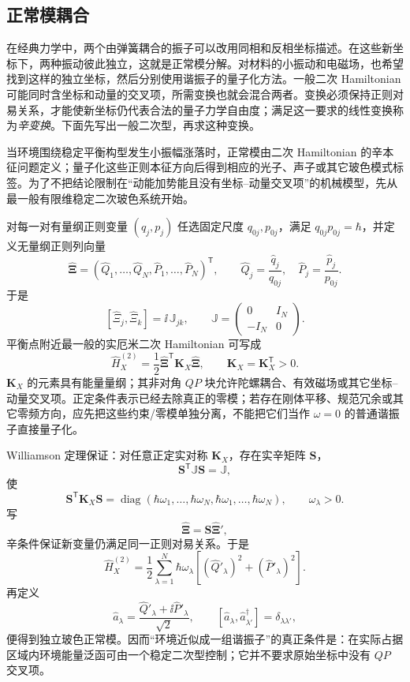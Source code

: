 

\subsection{正常模耦合}

在经典力学中，两个由弹簧耦合的振子可以改用同相和反相坐标描述。在这些新坐标下，两种振动彼此独立，这就是正常模分解。对材料的小振动和电磁场，也希望找到这样的独立坐标，然后分别使用谐振子的量子化方法。一般二次 Hamiltonian 可能同时含坐标和动量的交叉项，所需变换也就会混合两者。变换必须保持正则对易关系，才能使新坐标仍代表合法的量子力学自由度；满足这一要求的线性变换称为\emph{辛变换}。下面先写出一般二次型，再求这种变换。

当环境围绕稳定平衡构型发生小振幅涨落时，正常模由二次 Hamiltonian 的辛本征问题定义；量子化这些正则本征方向后得到相应的光子、声子或其它玻色模式标签。为了不把结论限制在“动能加势能且没有坐标--动量交叉项”的机械模型，先从最一般有限维稳定二次玻色系统开始。

对每一对有量纲正则变量 $(q_j,p_j)$ 任选固定尺度 $q_{0j},p_{0j}$，满足 $q_{0j}p_{0j}=\hbar$，并定义无量纲正则列向量
\[
\hat{\boldsymbol\Xi}
=
(\hat Q_1,\ldots,\hat Q_N,\hat P_1,\ldots,\hat P_N)^{\mathsf T},
\qquad
\hat Q_j=\frac{\hat q_j}{q_{0j}},
\quad
\hat P_j=\frac{\hat p_j}{p_{0j}}.
\]
于是
\[
[\hat\Xi_j,\hat\Xi_k]
=\ii\,\mathbb J_{jk},
\qquad
\mathbb J=
\begin{pmatrix}
0&I_N\\
-I_N&0
\end{pmatrix}.
\]
平衡点附近最一般的实厄米二次 Hamiltonian 可写成
\begin{equation}
\boxed{
\hat H_X^{(2)}
=
\frac12
\hat{\boldsymbol\Xi}^{\mathsf T}
\mathbf K_X
\hat{\boldsymbol\Xi},
\qquad
\mathbf K_X=\mathbf K_X^{\mathsf T}>0 .}
\label{eq:general_environment_quadratic_hamiltonian}
\end{equation}
$\mathbf K_X$ 的元素具有能量量纲；其非对角 $QP$ 块允许陀螺耦合、有效磁场或其它坐标--动量交叉项。正定条件表示已经去除真正的零模；若存在刚体平移、规范冗余或其它零频方向，应先把这些约束/零模单独分离，不能把它们当作 $\omega=0$ 的普通谐振子直接量子化。

Williamson 定理保证：对任意正定实对称 $\mathbf K_X$，存在实辛矩阵 $\mathbf S$，
\[
\mathbf S^{\mathsf T}\mathbb J\mathbf S=\mathbb J,
\]
使
\[
\mathbf S^{\mathsf T}\mathbf K_X\mathbf S
=
\operatorname{diag}
(\hbar\omega_1,\ldots,\hbar\omega_N,
 \hbar\omega_1,\ldots,\hbar\omega_N),
\qquad
\omega_\lambda>0.
\]
写
\[
\hat{\boldsymbol\Xi}
=\mathbf S\hat{\boldsymbol\Xi}',
\]
辛条件保证新变量仍满足同一正则对易关系。于是
\[
\hat H_X^{(2)}
=
\frac12\sum_{\lambda=1}^{N}
\hbar\omega_\lambda
\left[
(\hat Q'_\lambda)^2+(\hat P'_\lambda)^2
\right].
\]
再定义
\[
\hat a_\lambda
=
\frac{\hat Q'_\lambda+\ii\hat P'_\lambda}{\sqrt2},
\qquad
[\hat a_\lambda,\hat a_{\lambda'}^\dagger]
=\delta_{\lambda\lambda'},
\]
便得到独立玻色正常模。因而“环境近似成一组谐振子”的真正条件是：在实际占据区域内环境能量泛函可由一个稳定二次型控制；它并不要求原始坐标中没有 $QP$ 交叉项。

